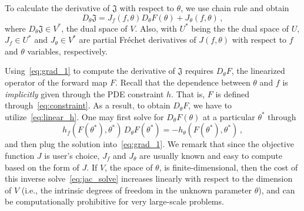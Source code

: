 \documentclass[12pt]{amsart}
\begin{document}
To calculate the derivative of $\mathfrak{J}$ with respect to $\theta$, we use chain rule and obtain
\begin{equation}\label{eq:grad_1}
 D_\theta \mathfrak{J} =   J_f(f, \theta)  D_\theta F(\theta) + J_\theta(f,\theta)\,,
\end{equation}
where $D_\theta\mathfrak{J} \in V^*$, the dual space of $V$. Also,  with $U^*$ being the the dual space of $U$, $ J_f \in U^*$  and $J_\theta \in V^* $ are partial Fr\'echet derivatives of $J(f,\theta)$ with respect to $f$ and $\theta$ variables, respectively.  

Using~\eqref{eq:grad_1}  to compute the derivative of $\mathfrak{J}$ requires  $D_\theta F$, the linearized operator of the forward map $F$. Recall that the dependence between $\theta$ and $f$ is \textit{implicitly} given through the PDE constraint $h$. That is, $F$ is defined through~\eqref{eq:constraint}. As a result, to obtain $D_\theta F$,  we have to utilize~\eqref{eq:linear_h}. One may first solve for $D_\theta F(\theta)$ at a particular $\theta^*$ 
through
\begin{equation}\label{eq:jac_solve}
h_f (F(\theta^*), \theta^*) \,  D_\theta F (\theta^*) = - h_\theta(F(\theta^*), \theta^*)\,,
\end{equation}
and then plug the solution into~\eqref{eq:grad_1}. We remark that since the objective function $J$ is user's choice, $J_f$ and $J_\theta$ are usually known and easy to compute based on the form of $J$. If $V$, the space of $\theta$, is finite-dimensional, then the cost of this inverse solve~\eqref{eq:jac_solve} increases linearly with respect to the dimension of $V$ (i.e., the intrinsic degrees of freedom in the unknown parameter $\theta$), and can be computationally prohibitive for very large-scale problems.
\end{document}
